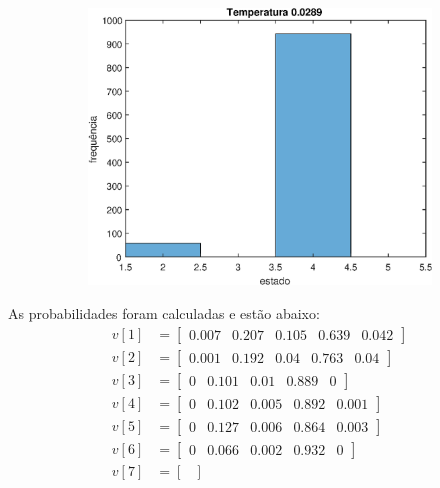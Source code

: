 \documentclass[12pt]{article}
\newenvironment{exercise}[2][Exercício]{\begin{trivlist}
\item[\hskip \labelsep {\bfseries #1}\hskip \labelsep {\bfseries #2.}]}{\end{trivlist}}
\begin{document}
\begin{exercise}{2.e}
\begin{figure}[H]
    \centering
    \begin{subfigure}[b]{0.3\textwidth}
        \includegraphics[width=\textwidth]{figs/ex2e_h10.eps}
    \end{subfigure}
\end{figure}
As probabilidades foram calculadas e estão abaixo:
\begin{align*}
v[1] &= \begin{bmatrix}
0.007 & 0.207 & 0.105 & 0.639 & 0.042
\end{bmatrix} \\
v[2] &= \begin{bmatrix}
0.001 & 0.192 & 0.04 & 0.763 & 0.04
\end{bmatrix} \\
v[3] &= \begin{bmatrix}
0 & 0.101 & 0.01 & 0.889 & 0
\end{bmatrix} \\
v[4] &= \begin{bmatrix}
0 & 0.102 & 0.005 & 0.892 & 0.001
\end{bmatrix} \\
v[5] &= \begin{bmatrix}
0 & 0.127 & 0.006 & 0.864 & 0.003
\end{bmatrix} \\
v[6] &= \begin{bmatrix}
0 & 0.066 & 0.002 & 0.932 & 0
\end{bmatrix} \\
v[7] &= \begin{bmatrix}

\end{bmatrix}
\end{align*}
\end{exercise}
\end{document}
